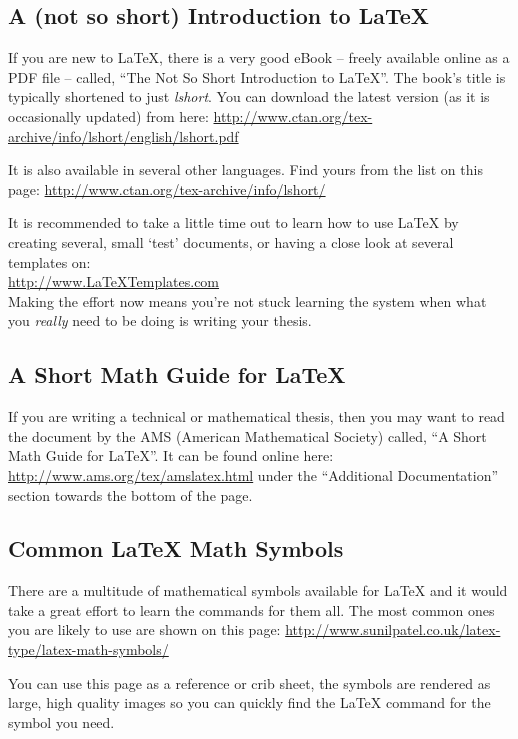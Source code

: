 \subsection{A (not so short) Introduction to \LaTeX{}}

If you are new to \LaTeX{}, there is a very good eBook -- freely available online as a PDF file -- called, \enquote{The Not So Short Introduction to \LaTeX{}}. The book's title is typically shortened to just \emph{lshort}. You can download the latest version (as it is occasionally updated) from here:
\url{http://www.ctan.org/tex-archive/info/lshort/english/lshort.pdf}

It is also available in several other languages. Find yours from the list on this page: \url{http://www.ctan.org/tex-archive/info/lshort/}

It is recommended to take a little time out to learn how to use \LaTeX{} by creating several, small `test' documents, or having a close look at several templates on:\\ 
\url{http://www.LaTeXTemplates.com}\\ 
Making the effort now means you're not stuck learning the system when what you \emph{really} need to be doing is writing your thesis.

\subsection{A Short Math Guide for \LaTeX{}}

If you are writing a technical or mathematical thesis, then you may want to read the document by the AMS (American Mathematical Society) called, \enquote{A Short Math Guide for \LaTeX{}}. It can be found online here:
\url{http://www.ams.org/tex/amslatex.html}
under the \enquote{Additional Documentation} section towards the bottom of the page.

\subsection{Common \LaTeX{} Math Symbols}
There are a multitude of mathematical symbols available for \LaTeX{} and it would take a great effort to learn the commands for them all. The most common ones you are likely to use are shown on this page:
\url{http://www.sunilpatel.co.uk/latex-type/latex-math-symbols/}

You can use this page as a reference or crib sheet, the symbols are rendered as large, high quality images so you can quickly find the \LaTeX{} command for the symbol you need.

